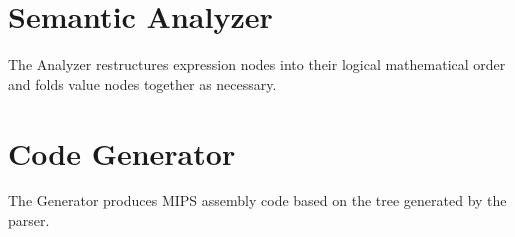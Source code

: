 \documentclass{article}
\begin{document}
\section{Semantic Analyzer}
The Analyzer restructures expression nodes into their logical mathematical order and folds value nodes together as necessary.

\section{Code Generator}
The Generator produces MIPS assembly code based on the tree generated by the parser.



\end{document}
